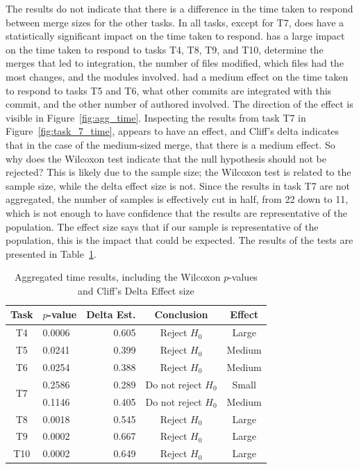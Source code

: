 The results do not indicate that there is a difference in the time taken
to respond between merge sizes for the other tasks. In all tasks, except
for T7, \tool{} does have a statistically significant impact on the time
taken to respond. \tool{} has a large impact on the time taken to
respond to tasks T4, T8, T9, and T10, determine the merges that led to
integration, the number of files modified, which files had the most
changes, and the modules involved. \tool{} had a medium effect on the
time taken to respond to tasks T5 and T6, what other commits are
integrated with this commit, and the other number of authored involved.
The direction of the effect is visible in Figure~\ref{fig:agg_time}.
Inspecting the results from task T7 in Figure~\ref{fig:task_7_time},
\tool{} appears to have an effect, and Cliff's delta indicates that in
the case of the medium-sized merge, that there is a medium effect. So
why does the Wilcoxon test indicate that the null hypothesis should not
be rejected? This is likely due to the sample size; the Wilcoxon test is
related to the sample size, while the delta effect size is not. Since
the results in task T7 are not aggregated, the number of samples is
effectively cut in half, from 22 down to 11, which is not enough to have
confidence that the results are representative of the population. The
effect size says that if our sample is representative of the population,
this is the impact that could be expected. The results of the tests are
presented in Table~\ref{tab:accuracy_results}.

\begin{table}[htpb]
  \centering
  \caption{Aggregated time results, including the Wilcoxon
    $p$-values and Cliff's Delta Effect size}
  \label{tab:accuracy_results}
  \begin{tabular}{clrcc}
    \toprule
    Task                & $p$-value & Delta Est. & Conclusion          & Effect\\\midrule
    T4                  & 0.0006    & 0.605      & Reject $H_0$        & Large\\
    T5                  & 0.0241    & 0.399      & Reject $H_0$        & Medium\\
    T6                  & 0.0254    & 0.388      & Reject $H_0$        & Medium\\
    \multirow{2}{*}{T7} & 0.2586    & 0.289      & Do not reject $H_0$ & Small\\
                        & 0.1146    & 0.405      & Do not reject $H_0$ & Medium\\
    T8                  & 0.0018    & 0.545      & Reject $H_0$        & Large\\
    T9                  & 0.0002    & 0.667      & Reject $H_0$        & Large\\
    T10                 & 0.0002    & 0.649      & Reject $H_0$        & Large\\
    \bottomrule
  \end{tabular}
\end{table}

